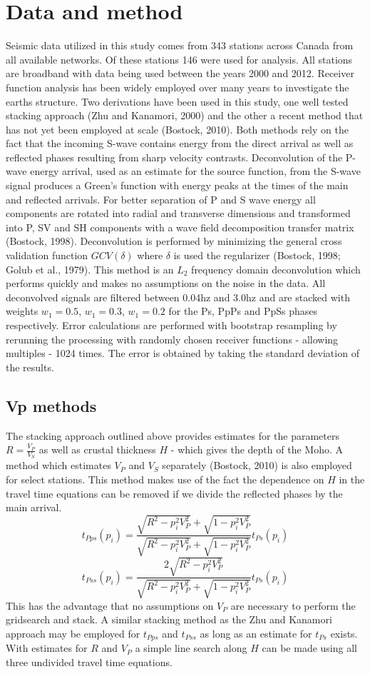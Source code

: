 \documentclass[draft]{article}
\begin{document}
\section{Data and method}
   Seismic data utilized in this study comes from 343 stations across Canada from all available networks. Of these stations 146 were used for analysis. All stations are broadband with data being used between the years 2000 and 2012. Receiver function analysis has been widely employed over many years to investigate the earths structure.
   Two derivations have been used in this study, one well tested stacking approach (Zhu and Kanamori, 2000) and the other a recent method that has not yet been employed at scale (Bostock, 2010). Both methods rely on the fact that the incoming S-wave contains energy from the direct arrival as well as reflected phases resulting from sharp velocity contrasts. Deconvolution of the P-wave energy arrival, used as an estimate for the source function, from the S-wave signal produces a Green's function with energy peaks at the times of the main and reflected arrivals. For better separation of P and S wave energy all components are rotated into radial and transverse dimensions and transformed into P, SV and SH components with a wave field decomposition transfer matrix (Bostock, 1998).
   Deconvolution is performed by minimizing the general cross validation function $GCV(\delta)$ where $\delta$ is used the regularizer (Bostock, 1998; Golub et al., 1979). This method is an $L_2$ frequency domain deconvolution which performs quickly and makes no assumptions on the noise in the data. All deconvolved signals are filtered between 0.04hz and 3.0hz and are stacked with weights $w_1=0.5$, $w_1=0.3$, $w_1=0.2$ for the Ps, PpPs and PpSs phases respectively. Error calculations are performed with bootstrap resampling by rerunning the processing with randomly chosen receiver functions - allowing multiples - 1024 times. The error is obtained by taking the standard deviation of the results.

\subsection{Vp methods}
   The stacking approach outlined above provides estimates for the parameters $R=\frac{V_P}{V_S}$ as well as crustal thickness $H$ - which gives the depth of the Moho. A method which estimates $V_P$ and $V_S$ separately (Bostock, 2010) is also employed for select stations. This method makes use of the fact the dependence on $H$ in the travel time equations can be removed if we divide the reflected phases by the main arrival.
$$ t_{Pps}(p_i) = \frac{ \sqrt{R^2-p_i^2V_P^2} + \sqrt{1-p_i^2V_P^2} } {\sqrt{R^2-p_i^2V_P^2} + \sqrt{1-p_i^2V_P^2} } t_{Ps}(p_i) $$
$$ t_{Pss}(p_i) = \frac{2\sqrt{R^2-p_i^2V_P^2}} {\sqrt{R^2-p_i^2V_P^2} + \sqrt{1-p_i^2V_P^2} } t_{Ps}(p_i) $$
This has the advantage that no assumptions on $V_P$ are necessary to perform the gridsearch and stack. A similar stacking method as the Zhu and Kanamori approach may be employed for $t_{Pps}$ and $t_{Pss}$ as long as an estimate for $t_{Ps}$ exists. With estimates for $R$ and $V_P$ a simple line search along $H$ can be made using all three undivided travel time equations.
\end{document}

